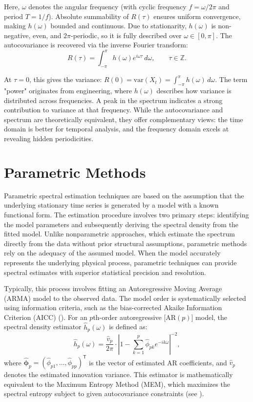 \documentclass[twoside]{article}
\begin{document}
Here, $\omega$ denotes the angular frequency (with cyclic frequency $f = \omega/2\pi$ and period $T = 1/f$). Absolute summability of $R(\tau)$ ensures uniform convergence, making $h(\omega)$ bounded and continuous. Due to stationarity, $h(\omega)$ is non-negative, even, and $2\pi$-periodic, so it is fully described over $\omega \in [0, \pi]$. The autocovariance is recovered via the inverse Fourier transform:
\begin{equation}
R(\tau) = \int_{-\pi}^{\pi} h(\omega) e^{i\omega \tau} \,d\omega, \qquad \tau \in \mathbb{Z}.
\end{equation}



At $\tau = 0$, this gives the variance: $R(0) = \text{var}(X_t) = \int_{-\pi}^{\pi} h(\omega) \, d\omega$. The term "power" originates from engineering, where $h(\omega)$ describes how variance is distributed across frequencies. A peak in the spectrum indicates a strong contribution to variance at that frequency. While the autocovariance and spectrum are theoretically equivalent, they offer complementary views: the time domain is better for temporal analysis, and the frequency domain excels at revealing hidden periodicities.



\section{Parametric Methods}
Parametric spectral estimation techniques are based on the assumption that the underlying stationary time series is generated by a model with a known functional form. The estimation procedure involves two primary steps: identifying the model parameters and subsequently deriving the spectral density from the fitted model. Unlike nonparametric approaches, which estimate the spectrum directly from the data without prior structural assumptions, parametric methods rely on the adequacy of the assumed model. When the model accurately represents the underlying physical process, parametric techniques can provide spectral estimates with superior statistical precision and resolution.



Typically, this process involves fitting an Autoregressive Moving Average (ARMA) model to the observed data. The model order is systematically selected using information criteria, such as the bias-corrected Akaike Information Criterion (AICC) (\cite{Akaike:1973}).
For an $p$th-order autoregressive [AR$(p)$] model, the spectral density estimator $\widehat{h}_p(\omega)$ is defined as:
\begin{equation}
\widehat{h}_p(\omega) = \frac{\widehat{v}_p}{2\pi} \cdot \left| 1 - \sum_{k=1}^{p} \widehat{\phi}_{pk} e^{-ik\omega} \right|^{-2},
\end{equation}
where $\widehat{\boldsymbol{\phi}}_p = (\widehat{\phi}_{p1}, \dots, \widehat{\phi}_{pp})^{\mathsf{T}}$ is the vector of estimated AR coefficients, and $\widehat{v}_p$ denotes the estimated innovation variance. This estimator is mathematically equivalent to the Maximum Entropy Method (MEM), which maximizes the spectral entropy subject to given autocovariance constraints (see \cite{BrockwellDavis:1991}).
\end{document}
